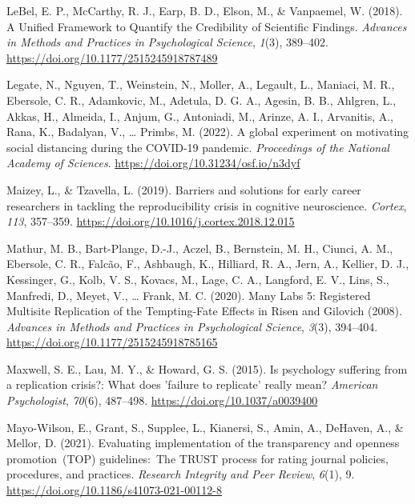 \documentclass[
  man]{apa7}
\newlength{\cslhangindent}
\newlength{\cslentryspacingunit} %
\newenvironment{CSLReferences}[2] %
 {%
  \setlength{\parindent}{0pt}
  \ifodd #1
  \let\oldpar\par
  \def\par{\hangindent=\cslhangindent\oldpar}
  \fi
  \setlength{\parskip}{#2\cslentryspacingunit}
 }%
 {}
\begin{document}
\begin{CSLReferences}{1}{0}
\leavevmode{}%
LeBel, E. P., McCarthy, R. J., Earp, B. D., Elson, M., \& Vanpaemel, W. (2018). A Unified Framework to Quantify the Credibility of Scientific Findings. \emph{Advances in Methods and Practices in Psychological Science}, \emph{1}(3), 389--402. \url{https://doi.org/10.1177/2515245918787489}

\leavevmode{}%
Legate, N., Nguyen, T., Weinstein, N., Moller, A., Legault, L., Maniaci, M. R., Ebersole, C. R., Adamkovic, M., Adetula, D. G. A., Agesin, B. B., Ahlgren, L., Akkas, H., Almeida, I., Anjum, G., Antoniadi, M., Arinze, A. I., Arvanitis, A., Rana, K., Badalyan, V., \ldots{} Primbs, M. (2022). A global experiment on motivating social distancing during the COVID-19 pandemic. \emph{Proceedings of the National Academy of Sciences}. \url{https://doi.org/10.31234/osf.io/n3dyf}

\leavevmode{}%
Maizey, L., \& Tzavella, L. (2019). Barriers and solutions for early career researchers in tackling the reproducibility crisis in cognitive neuroscience. \emph{Cortex}, \emph{113}, 357--359. \url{https://doi.org/10.1016/j.cortex.2018.12.015}

\leavevmode{}%
Mathur, M. B., Bart-Plange, D.-J., Aczel, B., Bernstein, M. H., Ciunci, A. M., Ebersole, C. R., Falcão, F., Ashbaugh, K., Hilliard, R. A., Jern, A., Kellier, D. J., Kessinger, G., Kolb, V. S., Kovacs, M., Lage, C. A., Langford, E. V., Lins, S., Manfredi, D., Meyet, V., \ldots{} Frank, M. C. (2020). Many Labs 5: Registered Multisite Replication of the Tempting-Fate Effects in Risen and Gilovich (2008). \emph{Advances in Methods and Practices in Psychological Science}, \emph{3}(3), 394--404. \url{https://doi.org/10.1177/2515245918785165}

\leavevmode{}%
Maxwell, S. E., Lau, M. Y., \& Howard, G. S. (2015). Is psychology suffering from a replication crisis?: What does 'failure to replicate' really mean? \emph{American Psychologist}, \emph{70}(6), 487--498. \url{https://doi.org/10.1037/a0039400}

\leavevmode{}%
Mayo-Wilson, E., Grant, S., Supplee, L., Kianersi, S., Amin, A., DeHaven, A., \& Mellor, D. (2021). Evaluating implementation of the transparency and openness promotion~(TOP) guidelines:~The TRUST process for rating journal policies, procedures, and practices. \emph{Research Integrity and Peer Review}, \emph{6}(1), 9. \url{https://doi.org/10.1186/s41073-021-00112-8}


\end{CSLReferences}
\end{document}
